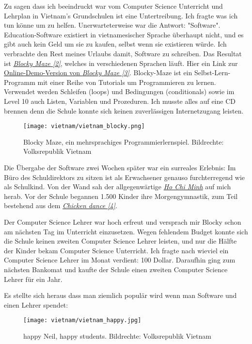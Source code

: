 \documentclass[10pt,a4paper,ngerman,twoside]{article} %
\begin{document}
Zu sagen dass ich beeindruckt war vom Computer Science Unterricht und Lehrplan in Vietnam's Grundschulen ist eine Untertreibung. Ich fragte was ich tun könne um zu helfen. Unerwarteterweise war die Antwort: "Software". Education-Software existiert in vietnamesischer Sprache überhaupt nicht, und es gibt auch kein Geld um sie zu kaufen, selbst wenn sie existieren würde.  Ich verbrachte den Rest meines Urlaubs damit, Software zu schreiben. Das Resultat ist \href{https://code.google.com/p/blockly/}{\textit{Blocky Maze [2]}}, welches in verschiedenen Sprachen läuft. Hier ein Link zur \href{http://blockly-demo.appspot.com/static/apps/maze/en.html?level=1}{Online-Demo-Version von \textit{Blocky Maze [3]}}. Blocky-Maze ist ein Selbst-Lern-Programm mit einer Reihe von Tutorials um Programmieren zu lernen. Verwendet werden Schleifen (loops) und Bedingungen (conditionals) sowie im Level 10 auch Listen, Variablen und Prozeduren. Ich musste alles auf eine CD brennen denn die Schule konnte sich keinen zuverlässigen Internetzugang leisten.

\begin{figure}
\texttt{[image: vietnam/vietnam\_blocky.png]}
\caption{Blocky Maze, ein mehrsprachiges Programmierlernspiel. Bildrechte: Volksrepublik Vietnam}
\end{figure}

Die Übergabe der Software zwei Wochen später war ein surreales Erlebnis: Im Büro des Schuldirektors zu sitzen ist als Erwachsener genauso furchterregend wie als Schulkind. Von der Wand sah der allgegenwärtige \href{http://goo.gl/fZATT3}{\textit{Ho Chi Minh}} auf mich herab. Vor der Schule begannen 1.500 Kinder ihre Morgengymnastik, zum Teil bestehend aus dem \href{http://www.youtube.com/watch?v=4xmV5uHWNag}{\textit{Chicken dance [4]}}.

Der Computer Science Lehrer war hoch erfreut und versprach mir Blocky schon am nächsten Tag im Unterricht einzusetzen. Wegen fehlendem Budget konnte sich die Schule keinen zweiten Computer Science Lehrer leisten, und nur die Hälfte der Kinder bekam Computer Science Unterricht. Ich fragte nach wieviel ein Computer Science Lehrer im Monat verdient: 100 Dollar. Daraufhin ging zum nächsten Bankomat und kaufte der Schule einen zweiten Computer Science Lehrer für ein Jahr.

Es stellte sich heraus dass man ziemlich populär wird wenn man Software und einen Lehrer spendet:
\begin{figure}
\texttt{[image: vietnam/vietnam\_happy.jpg]}
\caption{happy Neil, happy students. Bildrechte: Volksrepublik Vietnam}
\end{figure}
\end{document}
